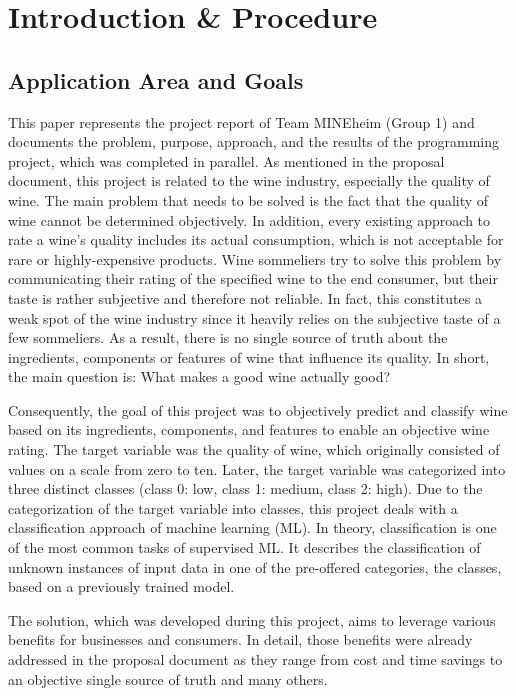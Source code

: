 \chapter{Introduction \& Procedure}
\section{Application Area and Goals}


This paper represents the project report of Team MINEheim (Group 1) and documents the problem, purpose, approach, and the results of the programming project, which was completed in parallel. As mentioned in the proposal document, this project is related to the wine industry, especially the quality of wine. The main problem that needs to be solved is the fact that the quality of wine cannot be determined objectively. In addition, every existing approach to rate a wine's quality includes its actual consumption, which is not acceptable for rare or highly-expensive products. Wine sommeliers try to solve this problem by communicating their rating of the specified wine to the end consumer, but their taste is rather subjective and therefore not reliable. In fact, this constitutes a weak spot of the wine industry since it heavily relies on the subjective taste of a few sommeliers. As a result, there is no single source of truth about the ingredients, components or features of wine that influence its quality. In short, the main question is: What makes a good wine actually good?

Consequently, the goal of this project was to objectively predict and classify wine based on its ingredients, components, and features to enable an objective wine rating. The target variable was the quality of wine, which originally consisted of values on a scale from zero to ten. Later, the target variable was categorized into three distinct classes (class 0: low, class 1: medium, class 2: high). Due to the categorization of the target variable into classes, this project deals with a classification approach of machine learning (ML). In theory, classification is one of the most common tasks of supervised ML. It describes the classification of unknown instances of input data in one of the pre-offered categories, the classes, based on a previously trained model. \citep{Novakovic2010}

The solution, which was developed during this project, aims to leverage various benefits for businesses and consumers. In detail, those benefits were already addressed in the proposal document as they range from cost and time savings to an objective single source of truth and many others. 